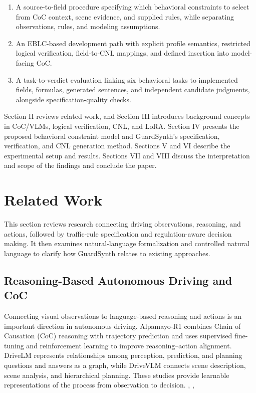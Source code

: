 \documentclass[nolineno]{ieeeaccess}
\begin{document}
\begin{enumerate}
\item A source-to-field procedure specifying which behavioral constraints to select from CoC context, scene evidence, and supplied rules, while separating observations, rules, and modeling assumptions.
\item An EBLC-based development path with explicit profile semantics, restricted logical verification, field-to-CNL mappings, and defined insertion into model-facing CoC.
\item A task-to-verdict evaluation linking six behavioral tasks to implemented fields, formulas, generated sentences, and independent candidate judgments, alongside specification-quality checks.
\end{enumerate}

Section II reviews related work, and Section III introduces background concepts in CoC/VLMs, logical verification, CNL, and LoRA. Section IV presents the proposed behavioral constraint model and GuardSynth's specification, verification, and CNL generation method. Sections V and VI describe the experimental setup and results. Sections VII and VIII discuss the interpretation and scope of the findings and conclude the paper.\par
\section{Related Work}

This section reviews research connecting driving observations, reasoning, and actions, followed by traffic-rule specification and regulation-aware decision making. It then examines natural-language formalization and controlled natural language to clarify how GuardSynth relates to existing approaches.\par

\subsection{Reasoning-Based Autonomous Driving and CoC}

Connecting visual observations to language-based reasoning and actions is an important direction in autonomous driving. Alpamayo-R1 combines Chain of Causation (CoC) reasoning with trajectory prediction and uses supervised fine-tuning and reinforcement learning to improve reasoning--action alignment. DriveLM represents relationships among perception, prediction, and planning questions and answers as a graph, while DriveVLM connects scene description, scene analysis, and hierarchical planning. These studies provide learnable representations of the process from observation to decision. \cite{r1}, \cite{r2}, \cite{r3}\par
\end{document}
